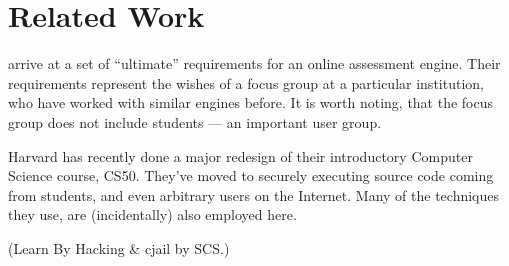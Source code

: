 
\section{Related Work}

\cite{sclater-howie-2003}  arrive at a set of ``ultimate'' requirements for an
online assessment engine. Their requirements represent the wishes of a focus
group at a particular institution, who have worked with similar engines before.
It is worth noting, that the focus group does not include students --- an
important user group.

Harvard has recently done a major redesign of their introductory Computer
Science course, CS50\cite{malan-2010a}. They've moved to securely executing
source code coming from students, and even arbitrary users on the
Internet\cite{malan-2010b,malan-2013}. Many of the techniques they use, are
(incidentally) also employed here.

(Learn By Hacking \& cjail by SCS.)
